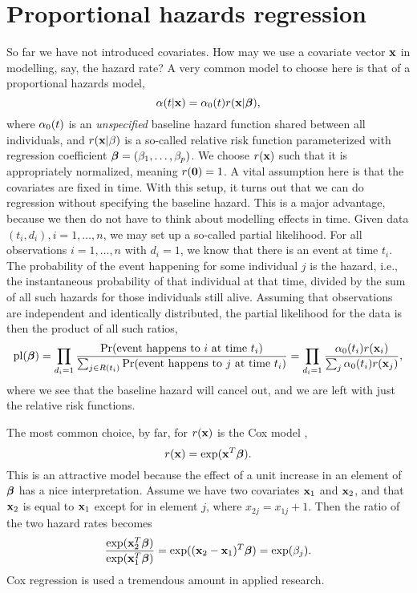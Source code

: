\section{Proportional hazards regression}
So far we have not introduced covariates. How may we use a covariate vector $\mathbf{x}$ in modelling, say, the hazard rate? A very common model to choose here is that of a proportional hazards model,
\begin{equation}\label{PH}
    \alpha(t|\mathbf{x})=\alpha_0(t)r(\mathbf{x}|\boldsymbol{\beta}),
\end{equation}
where $\alpha_0(t)$ is an \textit{unspecified} baseline hazard function shared between all individuals, and $r(\mathbf{x}|\beta)$ is a so-called relative risk function parameterized with regression coefficient $\boldsymbol{\beta}=(\beta_1,\ldots,\beta_p)$. We choose $r(\mathbf{x})$ such that it is appropriately normalized, meaning $r(\mathbf{0})=1$. A vital assumption here is that the covariates are fixed in time. With this setup, it turns out that we can do regression without specifying the baseline hazard. This is a major advantage, because we then do not have to think about modelling effects in time. Given data $(t_i,d_i),i=1,\ldots,n$, we may set up a so-called partial likelihood.  For all observations $i=1,\ldots,n$ with $d_i=1$, we know that there is an event at time $t_i$. The probability of the event happening for some individual $j$ is the hazard, i.e., the instantaneous probability of that individual at that time, divided by the sum of all such hazards for those individuals still alive. Assuming that observations are independent and identically distributed, the partial likelihood for the data is then the product of all such ratios,
\begin{equation*}
    \operatorname{pl}(\boldsymbol{\beta})=\prod_{d_i=1}\frac{\Pr(\text{event happens to }i\text{ at time }t_i)}{\sum_{j\in R(t_i)}\Pr(\text{event happens to }j\text{ at time }t_i)}=\prod_{d_i=1}\frac{\alpha_0(t_i)r(\mathbf{x}_i)}{\sum_j \alpha_0(t_i)r(\mathbf{x}_j)},
\end{equation*}
where we see that the baseline hazard will cancel out, and we are left with just the relative risk functions.

The most common choice, by far, for $r(\mathbf{x})$ is the Cox model \citep{cox},
\begin{equation*}
    r(\mathbf{x})=\exp(\mathbf{x}^T\boldsymbol{\beta}).
\end{equation*}
This is an attractive model because the effect of a unit increase in an element of $\boldsymbol{\beta}$ has a nice interpretation. Assume we have two covariates $\mathbf{x}_1$ and $\mathbf{x}_2$, and that $\mathbf{x}_2$ is equal to $\mathbf{x}_1$ except for in element $j$, where $x_{2j}=x_{1j}+1$. Then the ratio of the two hazard rates becomes
\begin{equation*}
    \frac{\exp(\mathbf{x}_2^T\boldsymbol{\beta})}{\exp(\mathbf{x}_1^T\boldsymbol{\beta})}=\exp((\mathbf{x}_2-\mathbf{x}_1)^T\boldsymbol{\beta})=\exp(\beta_j).
\end{equation*}
Cox regression is used a tremendous amount in applied research.

